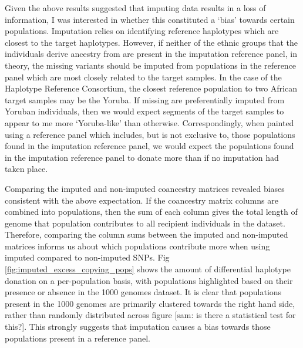 Given the above results suggested that imputing data results in a loss of information, I was interested in whether this constituted a `bias' towards certain populations. Imputation relies on identifying reference haplotypes which are closest to the target haplotypes. However, if neither of the ethnic groups that the individuals derive ancestry from are present in the imputation reference panel, in theory, the missing variants should be imputed from populations in the reference panel which are most closely related to the target samples. In the case of the Haplotype Reference Consortium, the closest reference population to two African target samples may be the Yoruba. If missing are preferentially imputed from Yoruban individuals, then we would expect segments of the target samples to appear to me more `Yoruba-like' than otherwise. Correspondingly, when painted using a reference panel which includes, but is not exclusive to, those populations found in the imputation reference panel, we would expect the populations found in the imputation reference panel to donate more than if no imputation had taken place.

Comparing the imputed and non-imputed coancestry matrices revealed biases consistent with the above expectation. If the coancestry matrix columns are combined into populations, then the sum of each column gives the total length of genome that population contributes to all recipient individuals in the dataset. Therefore, comparing the column sums between the imputed and non-imputed matrices informs us about which populations contribute more when using imputed compared to non-imputed SNPs. Fig \ref{fig:imputed_excess_copying_pops} shows the amount of differential haplotype donation on a per-population basis, with populations highlighted based on their presence or absence in the 1000 genomes dataset. It is clear that populations present in the 1000 genomes are primarily clustered towards the right hand side, rather than randomly distributed across figure [sam: is there a statistical test for this?]. This strongly suggests that imputation causes a bias towards those populations present in a reference panel. 

